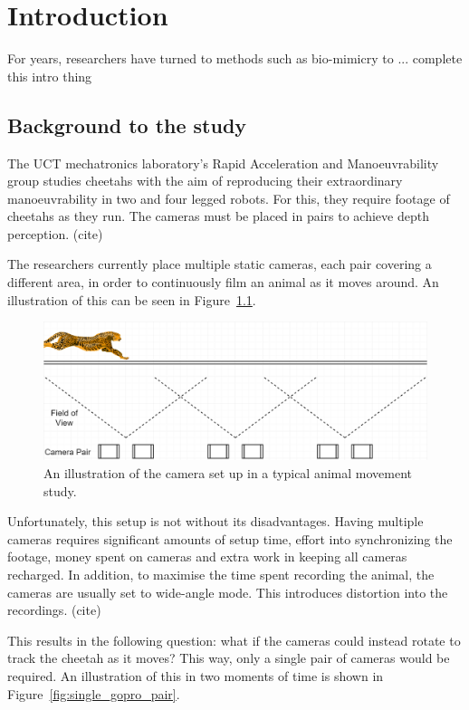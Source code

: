 \chapter{Introduction}
For years, researchers have turned to methods such as bio-mimicry to ... {\color{red} complete this intro thing}

\section{Background to the study}
The UCT mechatronics laboratory's Rapid Acceleration and Manoeuvrability group studies cheetahs with the aim of reproducing their extraordinary manoeuvrability in two and four legged robots. For this, they require footage of cheetahs as they run. The cameras must be placed in pairs to achieve depth perception. {\color{red} (cite)}

The researchers currently place multiple static cameras, each pair covering a different area, in order to continuously film an animal as it moves around. An illustration of this can be seen in Figure~\ref{fig:multiple_gopro_pairs}. \\

\begin{figure}[h!]
  \centering
  \includegraphics[width=\textwidth]{multiple_gopro_pairs}
  \caption{\label{fig:multiple_gopro_pairs} An illustration of the camera set up in a typical animal movement study.}
\end{figure}

Unfortunately, this setup is not without its disadvantages. Having multiple cameras requires significant amounts of setup time, effort into synchronizing the footage, money spent on cameras and extra work in keeping all cameras recharged. In addition, to maximise the time spent recording the animal, the cameras are usually set to wide-angle mode. This introduces distortion into the recordings. {\color{red} (cite)}

This results in the following question: what if the cameras could instead rotate to track the cheetah as it moves? This way, only a single pair of cameras would be required. An illustration of this in two moments of time is shown in Figure~\ref{fig:single_gopro_pair}.

